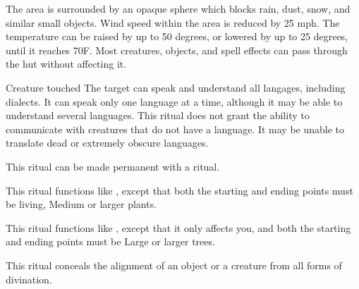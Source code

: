 \spelldur{\durext \dismissable}
\spellline
\spelleffect The area is surrounded by an opaque sphere which blocks rain, dust, snow, and similar small objects. Wind speed within the area is reduced by 25 mph. The temperature can be raised by up to 50 degrees, or lowered by up to 25 degrees, until it reaches 70\degree F.
\spellnotes Most creatures, objects, and spell effects can pass through the hut without affecting it.

\spelldur{\durlong}
\begin{spelltarget}{Creature touched}
    \spelleffect The target can speak and understand all langages, including dialects. It can speak only one language at a time, although it may be able to understand several languages.
\spellnotes This ritual does not grant the ability to communicate with creatures that do not have a language. It may be unable to translate dead or extremely obscure languages. 

This ritual can be made permanent with a  ritual.

\spellline
\spelleffect This ritual functions like , except that both the starting and ending points must be living, Medium or larger plants.

\spellspecial This ritual functions like , except that it only affects you, and both the starting and ending points must be Large or larger trees.

\spelldur{\durext \dismissable}
\spelleffect This ritual conceals the alignment of an object or a creature from all forms of divination.


\end{spelltarget}
